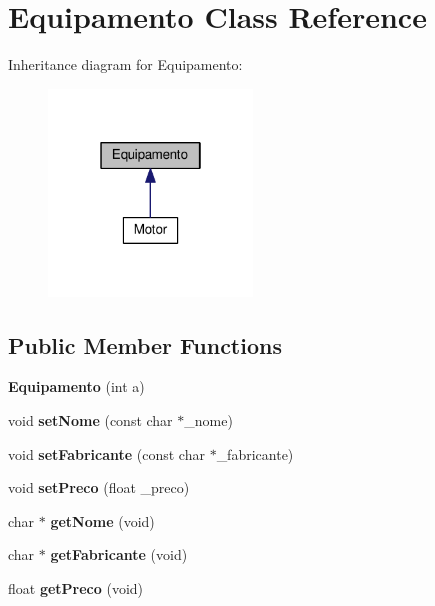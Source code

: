 \hypertarget{class_equipamento}{}\section{Equipamento Class Reference}
\label{class_equipamento}


Inheritance diagram for Equipamento\+:
\nopagebreak
\begin{figure}[H]
\begin{center}
\leavevmode
\includegraphics[width=154pt]{class_equipamento__inherit__graph}
\end{center}
\end{figure}
\subsection*{Public Member Functions}
\begin{DoxyCompactItemize}
\item 
{\bfseries Equipamento} (int a)\hypertarget{class_equipamento_a1553c92f3915ebbe7aee549d2862e440}{}\label{class_equipamento_a1553c92f3915ebbe7aee549d2862e440}

\item 
void {\bfseries set\+Nome} (const char $\ast$\+\_\+nome)\hypertarget{class_equipamento_a76c33c8f7b2c89846ce61cdbca58bbf8}{}\label{class_equipamento_a76c33c8f7b2c89846ce61cdbca58bbf8}

\item 
void {\bfseries set\+Fabricante} (const char $\ast$\+\_\+fabricante)\hypertarget{class_equipamento_a1c351fbecfef13a2ac8fa9463775e6bd}{}\label{class_equipamento_a1c351fbecfef13a2ac8fa9463775e6bd}

\item 
void {\bfseries set\+Preco} (float \+\_\+preco)\hypertarget{class_equipamento_a0b1dd21201ccba14cd1d81c1bc847eb1}{}\label{class_equipamento_a0b1dd21201ccba14cd1d81c1bc847eb1}

\item 
char $\ast$ {\bfseries get\+Nome} (void)\hypertarget{class_equipamento_af81556836f39fc85d040166f58bffee2}{}\label{class_equipamento_af81556836f39fc85d040166f58bffee2}

\item 
char $\ast$ {\bfseries get\+Fabricante} (void)\hypertarget{class_equipamento_a278f503c052f67aba47b9b50b8b95247}{}\label{class_equipamento_a278f503c052f67aba47b9b50b8b95247}

\item 
float {\bfseries get\+Preco} (void)\hypertarget{class_equipamento_a4f44529a6f56c319c9d669eb4a339c03}{}\label{class_equipamento_a4f44529a6f56c319c9d669eb4a339c03}

\end{DoxyCompactItemize}
